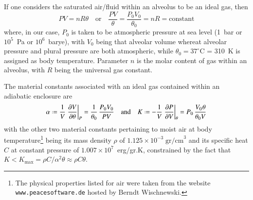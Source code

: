 If one considers the saturated air\slash fluid within an alveolus to be an ideal gas, then \cite{Davison08}
\begin{equation}
P V = n \! R \theta
\quad \text{or} \quad
\frac{P V}{\theta} = \frac{P_0 V_0}{\theta_0} = n \! R = \mathrm{constant}
\label{idealGas}
\end{equation}
where, in our case, $P_0$ is taken to be atmospheric pressure at sea level (1~bar or $10^5$~Pa or $10^6$~barye), with $V_0$ being that alveolar volume whereat alveolar pressure and plural pressure are both atmospheric, while $\theta_0 = 37^{\circ}$C = 310~K is assigned as body temperature.  Parameter $n$ is the molar content of gas within an alveolus, with $R$  being the universal gas constant.  

The material constants associated with an ideal gas contained within an adiabatic enclosure are
\begin{equation}
\alpha \defeq \frac{1}{V} \left. \frac{\partial V}{\partial \theta} \right|_P = 
\frac{1}{\theta_0} \, \frac{P_0 V_0}{P V}
\quad \text{and} \quad
K \defeq -\frac{1}{V} \left. \frac{\partial P}{\partial V} \right|_{\theta} = 
P_0 \, \frac{V_0 \hspace{0.5pt} \theta}{\theta_0 V}
\label{idealGasConstants}
\end{equation}
with the other two material constants pertaining to moist air at body temperature\footnote{
    The physical properties listed for air were taken from the website \texttt{www.peacesoftware.de} hosted by Berndt Wischnewski.
}
being its mass density $\rho$ of $1.125 \times 10^{-3} \; \text{gr/cm}^3$ and its specific heat $C$ at constant pressure of $1.007 \times 10^7$~erg/gr.K, constrained by the fact that $K < K_{\max} = \rho C / \alpha^2 \theta \approx \rho C \theta$.

